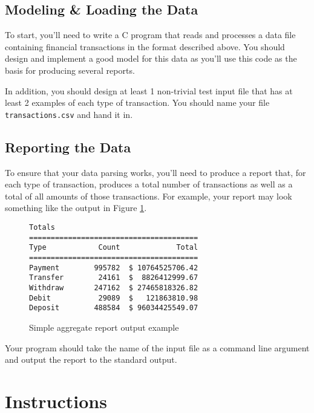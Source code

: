 \documentclass[12pt]{scrartcl}
\begin{document}
\subsection*{Modeling \& Loading the Data}

To start, you'll need to write a C program that reads and processes 
a data file containing financial transactions in the format described above.  
You should design and implement a good model for this data as you'll use 
this code as the basis for producing several reports.

In addition, you should design at least 1 non-trivial test input file that 
has at least 2 examples of each type of transaction.  You should name your
file \texttt{transactions.csv} and hand it in.

\subsection*{Reporting the Data}

To ensure that your data parsing works, you'll need to produce a report
that, for each type of transaction, produces a total number of transactions 
as well as a total of all amounts of those transactions.  For example, 
your report may look something like the output in Figure 
\ref{figure:simpleReport}.

\begin{figure}[ht]
\begin{verbatim}
Totals 
=======================================
Type            Count             Total
=======================================
Payment        995782  $ 10764525706.42
Transfer        24161  $  8826412999.67
Withdraw       247162  $ 27465818326.82
Debit           29089  $   121863810.98
Deposit        488584  $ 96034425549.07
\end{verbatim}
\caption{Simple aggregate report output example}
\label{figure:simpleReport}
\end{figure}

Your program should take the name of the input file as a command line argument
and output the report to the standard output.


\section*{Instructions}
\end{document}
